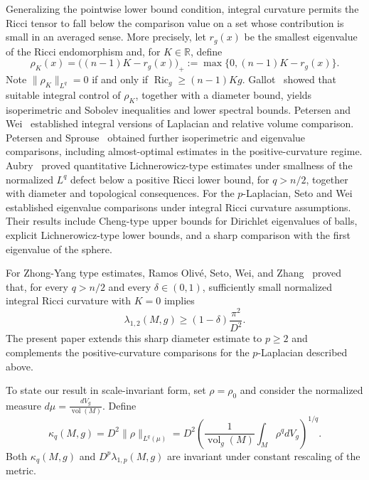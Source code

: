 \documentclass[11pt]{amsart}
\DeclareMathOperator{\Ric}{Ric}
\DeclareMathOperator{\vol}{vol}
\DeclareMathOperator{\Vol}{vol}
\theoremstyle{definition}
\begin{document}
Generalizing the pointwise lower bound condition, integral curvature permits the Ricci tensor to fall below the comparison value on a set whose contribution is small in an averaged sense. More precisely, let $r_g(x)$ be the smallest eigenvalue of the Ricci endomorphism and, for $K\in\mathbb R$, define
\[
 \rho_K(x)=\bigl((n-1)K-r_g(x)\bigr)_+:=\max\{0,(n-1)K-r_g(x)\}.
\]
Note $\|\rho_K\|_{L^q}=0$ if and only if $\Ric_g\ge(n-1)Kg$. Gallot~\cite{Gallot1988} showed that suitable integral control of $\rho_K$, together with a diameter bound, yields isoperimetric and Sobolev inequalities and lower spectral bounds. Petersen and Wei~\cite{PetersenWei1997} established integral versions of Laplacian and relative volume comparison. Petersen and Sprouse~\cite{PetersenSprouse1998} obtained further isoperimetric and eigenvalue comparisons, including almost-optimal estimates in the positive-curvature regime. Aubry~\cite{Aubry2007} proved quantitative Lichnerowicz-type estimates under smallness of the normalized $L^q$ defect below a positive Ricci lower bound, for $q>n/2$, together with diameter and topological consequences.  For the $p$-Laplacian, Seto and Wei~\cite{SetoWei2017} established eigenvalue comparisons under integral Ricci curvature assumptions. Their results include Cheng-type upper bounds for Dirichlet eigenvalues of balls, explicit Lichnerowicz-type lower bounds, and a sharp comparison with the first eigenvalue of the sphere.

 For Zhong-Yang type estimates, Ramos Oliv\'e, Seto, Wei, and Zhang~\cite{RamosSetoWeiZhang2020} proved that, for every $q>n/2$ and every $\delta\in(0,1)$, sufficiently small normalized integral Ricci curvature with $K=0$ implies
\[
 \lambda_{1,2}(M,g)\ge(1-\delta)\frac{\pi^2}{D^2}.
\]
 The present paper extends this sharp diameter estimate to $p\ge2$ and complements the positive-curvature comparisons for the $p$-Laplacian described above.

To state our result in scale-invariant form, set $\rho=\rho_0$ and consider the normalized measure $d\mu = \frac{dV_g}{\vol(M)}.$
Define
\begin{equation}\label{eq:kappa}
 \kappa_q(M,g)=D^2\|\rho\|_{L^q(\mu)}
 =D^2\left(\frac{1}{\Vol_g(M)}\int_M\rho^q  dV_g\right)^{1/q}.
\end{equation}
Both $\kappa_q(M,g)$ and $D^p\lambda_{1,p}(M,g)$ are invariant under constant rescaling of the metric.
\end{document}
